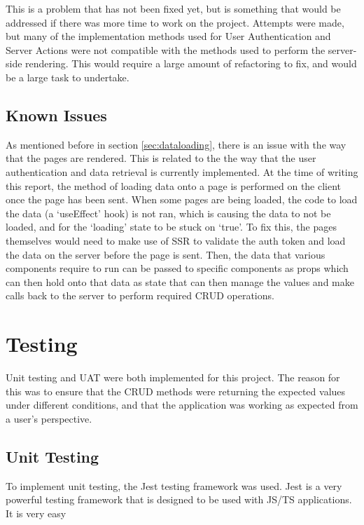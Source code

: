 \documentclass[11pt, a4paper,twoside]{report}
\theoremstyle{plain} %
\theoremstyle{definition} %
\numberwithin{equation}{chapter}
\begin{document}
This is a problem that has not been fixed yet, but is something that would be
addressed if there was more time to work on the project. Attempts were made,
but many of the implementation methods used for User Authentication and Server
Actions were not compatible with the methods used to perform the server-side
rendering. This would require a large amount of refactoring to fix, and would
be a large task to undertake.

\section{Known Issues}\label{sec:knownissues}

As mentioned before in section \ref{sec:dataloading}, there is an issue with
the way that the pages are rendered. This is related to the the way that the
user authentication and data retrieval is currently implemented. At the time of
writing this report, the method of loading data onto a page is performed on the
client once the page has been sent. When some pages are being loaded, the code
to load the data (a `useEffect' hook) is not ran, which is causing the data to
not be loaded, and for the `loading' state to be stuck on `true'. To fix this,
the pages themselves would need to make use of SSR to validate the auth token
and load the data on the server before the page is sent. Then, the data that
various components require to run can be passed to specific components as props
which can then hold onto that data as state that can then manage the values and
make calls back to the server to perform required CRUD operations.

\chapter{Testing}\label{ch:testing}

Unit testing and UAT were both implemented for this project. The reason for
this was to ensure that the CRUD methods were returning the expected values
under different conditions, and that the application was working as expected
from a user's perspective.

\section{Unit Testing}\label{sec:unittesting}

To implement unit testing, the Jest testing framework was used. Jest is a very
powerful testing framework that is designed to be used with JS/TS applications.
It is very easy
\end{document}
